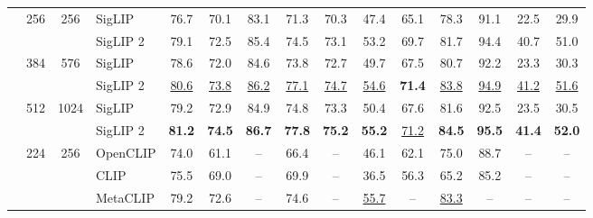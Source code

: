 \begin{tabular}{lcclccccccccccc}
\arrayrulecolor{lightgray}\hhline{|~|--------------|} 
 & \multirow[c]{2}{*}{256} & \multirow[c]{2}{*}{256} & SigLIP \cite{siglip} & 76.7 & 70.1 & 83.1 & 71.3 & 70.3 & 47.4 & 65.1 & 78.3 & 91.1 & 22.5 & 29.9 \\
 &  &  & \cellcolor{gray!15}SigLIP 2 & \cellcolor{gray!15}79.1 & \cellcolor{gray!15}72.5 & \cellcolor{gray!15}85.4 & \cellcolor{gray!15}74.5 & \cellcolor{gray!15}73.1 & \cellcolor{gray!15}53.2 & \cellcolor{gray!15}69.7 & \cellcolor{gray!15}81.7 & \cellcolor{gray!15}94.4 & \cellcolor{gray!15}40.7 & \cellcolor{gray!15}51.0 \\
\arrayrulecolor{lightgray}\hhline{|~|--------------|} 
 & \multirow[c]{2}{*}{384} & \multirow[c]{2}{*}{576} & SigLIP \cite{siglip} & 78.6 & 72.0 & 84.6 & 73.8 & 72.7 & 49.7 & 67.5 & 80.7 & 92.2 & 23.3 & 30.3 \\
 &  &  & \cellcolor{gray!15}SigLIP 2 & \cellcolor{gray!15}\underline{80.6} & \cellcolor{gray!15}\underline{73.8} & \cellcolor{gray!15}\underline{86.2} & \cellcolor{gray!15}\underline{77.1} & \cellcolor{gray!15}\underline{74.7} & \cellcolor{gray!15}\underline{54.6} & \cellcolor{gray!15}\bf{71.4} & \cellcolor{gray!15}\underline{83.8} & \cellcolor{gray!15}\underline{94.9} & \cellcolor{gray!15}\underline{41.2} & \cellcolor{gray!15}\underline{51.6} \\
\arrayrulecolor{lightgray}\hhline{|~|--------------|} 
 & \multirow[c]{2}{*}{512} & \multirow[c]{2}{*}{1024} & SigLIP \cite{siglip} & 79.2 & 72.9 & 84.9 & 74.8 & 73.3 & 50.4 & 67.6 & 81.6 & 92.5 & 23.5 & 30.5 \\
 &  &  & \cellcolor{gray!15}SigLIP 2 & \cellcolor{gray!15}\bf{81.2} & \cellcolor{gray!15}\bf{74.5} & \cellcolor{gray!15}\bf{86.7} & \cellcolor{gray!15}\bf{77.8} & \cellcolor{gray!15}\bf{75.2} & \cellcolor{gray!15}\bf{55.2} & \cellcolor{gray!15}\underline{71.2} & \cellcolor{gray!15}\bf{84.5} & \cellcolor{gray!15}\bf{95.5} & \cellcolor{gray!15}\bf{41.4} & \cellcolor{gray!15}\bf{52.0} \\
\arrayrulecolor{black}\hhline{|---------------|} 
\multirow[c]{6}{*}{L/14} & \multirow[c]{6}{*}{224} & \multirow[c]{6}{*}{256} & OpenCLIP \cite{ilharco2021open} & 74.0 & 61.1 & -- & 66.4 & -- & 46.1 & 62.1 & 75.0 & 88.7 & -- & -- \\
 &  &  & CLIP \cite{clip} & 75.5 & 69.0 & -- & 69.9 & -- & 36.5 & 56.3 & 65.2 & 85.2 & -- & -- \\
 &  &  & MetaCLIP \cite{xu2024demystifying} & 79.2 & 72.6 & -- & 74.6 & -- & \underline{55.7} & -- & \underline{83.3} & -- & -- & -- \\

\end{tabular}
